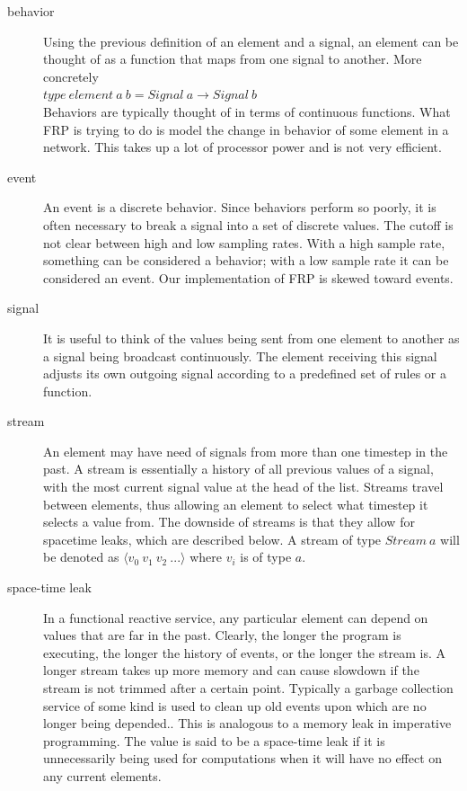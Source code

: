 \documentclass[twocolumn,11pt,english]{article}
\begin{document}
\begin{description}


\item[behavior] Using the previous definition of an element and a signal, an element can be thought of as a function that maps from one signal to another. More concretely \\
  $type~element~a~b = Signal ~a \rightarrow Signal ~b$\\
  Behaviors are typically thought of in terms of continuous functions. What FRP is trying to do is model the change in behavior of some element in a network. This takes up a lot of processor power  and is not very efficient.

\item[event] An event is a discrete behavior. Since behaviors perform so poorly, it is often necessary to break a signal into a set of discrete values. The cutoff is not clear between high and low sampling rates. With a high sample rate, something can be considered a behavior; with a low sample rate it can be considered an event. Our implementation of FRP is skewed toward events.

\item[signal] It is useful to think of the values being sent from one element to another as a signal being broadcast continuously. The element receiving this signal adjusts its own outgoing signal according to a predefined set of rules or a function.

\item[stream] An element may have need of signals from more than one timestep in the past. A stream is essentially a history of all previous values of a signal, with the most current signal value at the head of the list. Streams travel between elements, thus allowing an element to select what timestep it selects a value from. The downside of streams is that they allow for spacetime leaks, which are described below. A stream of type $Stream~a$ will be denoted as $\langle v_0~v_1~v_2~...\rangle$ where $v_i$ is of type $
a$.

\item[space-time leak] In a functional reactive service, any particular element can depend on values that are far in the past. Clearly, the longer the program is executing, the longer the history of events, or the longer the stream is. A longer stream takes up more memory and can cause slowdown if the stream is not trimmed after a certain point. Typically a garbage collection service of some kind is used to clean up old events upon which are no longer being depended.. This is analogous to a memory leak in imperative programming. The value is said to be a space-time leak if it is unnecessarily being used for computations when it will have no effect on any current elements.
\end{description}
\end{document}
